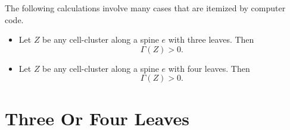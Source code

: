 \begin{calculation}\label{calc:shorts}\cutrate{}
The following calculations involve many cases that are itemized by
computer code.
\begin{itemize}\wasitemize 
\item {} Let $Z$ be any cell-cluster along a spine $e$
with three leaves.  Then
\[ 
\Gamma(Z)> 0.
\] 
\item {} Let $Z$ be any cell-cluster along a spine $e$
with four leaves.  Then
\[ 
\Gamma(Z)> 0.
\] 
\end{itemize}\wasitemize 
\end{calculation}





%
%
%



\section{Three Or Four Leaves}\label{sec:3or4}

